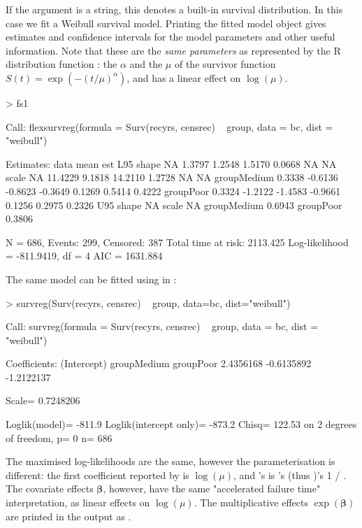 \documentclass[nojss,nofooter]{jss}
\begin{document}
If the argument  is a string, this denotes a built-in
survival distribution.  In this case we fit a Weibull survival model.
Printing the fitted model object gives estimates and confidence
intervals for the model parameters and other useful information.  Note
that these are the \emph{same parameters} as represented by the R
distribution function : the  $\alpha$ and
the  $\mu$ of the survivor function $S(t) =
\exp(-(t/\mu)^\alpha)$, and  has a linear effect on
$\log(\mu)$.
\begin{Schunk}
\begin{Sinput}
> fs1
\end{Sinput}
\begin{Soutput}
Call:
flexsurvreg(formula = Surv(recyrs, censrec) ~ group, data = bc,     dist = "weibull")

Estimates: 
             data mean  est      L95%     U95%     se       exp(est)  L95%   
shape             NA     1.3797   1.2548   1.5170   0.0668       NA        NA
scale             NA    11.4229   9.1818  14.2110   1.2728       NA        NA
groupMedium   0.3338    -0.6136  -0.8623  -0.3649   0.1269   0.5414    0.4222
groupPoor     0.3324    -1.2122  -1.4583  -0.9661   0.1256   0.2975    0.2326
             U95%   
shape             NA
scale             NA
groupMedium   0.6943
groupPoor     0.3806

N = 686,  Events: 299,  Censored: 387
Total time at risk: 2113.425
Log-likelihood = -811.9419, df = 4
AIC = 1631.884
\end{Soutput}
\end{Schunk}
The same model can be fitted using  in 
:
\begin{Schunk}
\begin{Sinput}
> survreg(Surv(recyrs, censrec) ~ group, data=bc, dist="weibull")
\end{Sinput}
\begin{Soutput}
Call:
survreg(formula = Surv(recyrs, censrec) ~ group, data = bc, dist = "weibull")

Coefficients:
(Intercept) groupMedium   groupPoor 
  2.4356168  -0.6135892  -1.2122137 

Scale= 0.7248206 

Loglik(model)= -811.9   Loglik(intercept only)= -873.2
	Chisq= 122.53 on 2 degrees of freedom, p= 0 
n= 686 
\end{Soutput}
\end{Schunk}
The maximised log-likelihoods are the same, however the
parameterisation is different: the first coefficient
 reported by  is $\log(\mu)$, and
's  is 's (thus
)'s 1 / . The covariate effects
$\bm{\beta}$, however, have the same "accelerated failure time"
interpretation, as linear effects on $\log(\mu)$.  The multiplicative
effects $\exp(\bm{\beta})$ are printed in the output as
.
\end{document}
